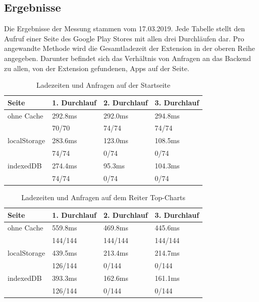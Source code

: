 \subsection{Ergebnisse}
\label{ss:ergebnisseht2}

Die Ergebnisse der Messung stammen vom 17.03.2019. Jede Tabelle stellt den Aufruf einer Seite des Google Play Stores mit allen drei Durchläufen dar. Pro angewandte Methode wird die Gesamtladezeit der Extension in der oberen Reihe angegeben. Darunter befindet sich das Verhältnis von Anfragen an das Backend zu allen, von der Extension gefundenen, Apps auf der Seite.


\begin{table}[h]
	\begin{tabular}{p{2.8cm}C{3.0cm}C{2.8cm}C{3.0cm}}
		\toprule
		\textbf{Seite}	&	\textbf{1. Durchlauf}	&	\textbf{2. Durchlauf}	& \textbf{3. Durchlauf}\\
			\midrule
			ohne Cache	&	292.8ms	&	292.0ms	&	294.8ms	\\
						&	70/70	&	74/74	&	74/74	\\

			localStorage	&	283.6ms	&	123.0ms	&	108.5ms	\\
						&	74/74	&	0/74	&	0/74	\\

			indexedDB	&	274.4ms	&	95.3ms	&	104.3ms	\\
						&	74/74	&	0/74	&	0/74	\\

			\bottomrule
		\end{tabular}
		\caption{Ladezeiten und Anfragen auf der Startseite}
		\label{ergebnis11}
\end{table}

\begin{table}[h]
	\begin{tabular}{p{2.8cm}C{3.0cm}C{2.8cm}C{3.0cm}}
		\toprule
		\textbf{Seite}	&	\textbf{1. Durchlauf}	&	\textbf{2. Durchlauf}	& \textbf{3. Durchlauf}\\
		\midrule
		ohne Cache	&	559.8ms	&	469.8ms	&	445.6ms	\\
		&	144/144	&	144/144	&	144/144	\\
		
		localStorage	&	439.5ms	&	213.4ms	&	214.7ms	\\
		&	126/144		&	0/144	&	0/144	\\
		
		indexedDB	&	393.3ms	&	162.6ms	&	161.1ms	\\
		&	126/144	&	0/144	&	0/144	\\
		
		\bottomrule
	\end{tabular}
	\caption{Ladezeiten und Anfragen auf dem Reiter \glqq Top-Charts \grqq{}}
	\label{ergebnis2}
\end{table}

